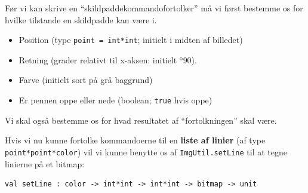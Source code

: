 \documentclass[rgb]{beamer}
\begin{document}
\begin{frame}[fragile]
\begin{footnotesize}

  \vspace{1ex}

  Før vi kan skrive en ``skildpaddekommandofortolker'' må vi først
  bestemme os for hvilke tilstande en skildpadde kan være i.

  \vspace{1ex}

  \vspace{1ex}
  \begin{itemize}
  \item Position (type \lstinline{point = int*int}; initielt i midten af billedet)
  \item Retning (grader relativt til x-aksen: initielt $^\mathrm{o}$90).
  \item Farve (initielt sort på grå baggrund)
  \item Er pennen oppe eller nede (boolean; \lstinline{true} hvis oppe)
  \end{itemize}

  \vspace{1ex}
  Vi skal også bestemme os for hvad resultatet af ``fortolkningen'' skal være.
  \vspace{1ex}

  Hvis vi nu kunne fortolke kommandoerne til en \textbf{liste af
  linier} (af type \lstinline{point*point*color}) vil vi kunne benytte os af
  \lstinline{ImgUtil.setLine} til at tegne linierne på et bitmap:
\begin{lstlisting}[numbers=none,frame=none,mathescape]
val setLine : color -> int*int -> int*int -> bitmap -> unit
\end{lstlisting}

\end{footnotesize}
\end{frame}
\end{document}

